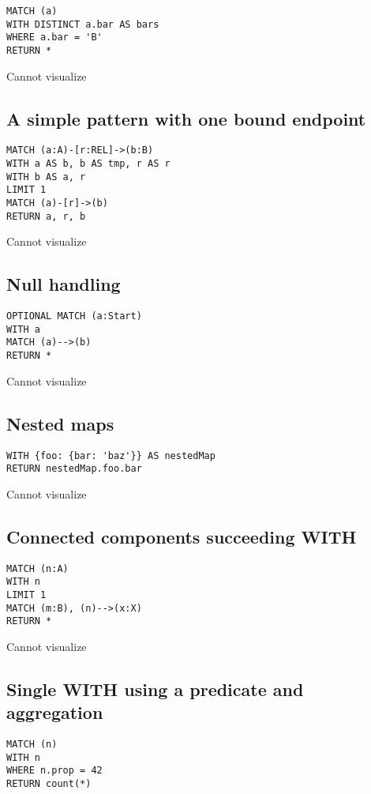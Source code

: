 \begin{lstlisting}
MATCH (a)
WITH DISTINCT a.bar AS bars
WHERE a.bar = 'B'
RETURN *
\end{lstlisting}

Cannot visualize
\subsection{A simple pattern with one bound endpoint}

\begin{lstlisting}
MATCH (a:A)-[r:REL]->(b:B)
WITH a AS b, b AS tmp, r AS r
WITH b AS a, r
LIMIT 1
MATCH (a)-[r]->(b)
RETURN a, r, b
\end{lstlisting}

Cannot visualize
\subsection{Null handling}

\begin{lstlisting}
OPTIONAL MATCH (a:Start)
WITH a
MATCH (a)-->(b)
RETURN *
\end{lstlisting}

Cannot visualize
\subsection{Nested maps}

\begin{lstlisting}
WITH {foo: {bar: 'baz'}} AS nestedMap
RETURN nestedMap.foo.bar
\end{lstlisting}

Cannot visualize
\subsection{Connected components succeeding WITH}

\begin{lstlisting}
MATCH (n:A)
WITH n
LIMIT 1
MATCH (m:B), (n)-->(x:X)
RETURN *
\end{lstlisting}

Cannot visualize
\subsection{Single WITH using a predicate and aggregation}

\begin{lstlisting}
MATCH (n)
WITH n
WHERE n.prop = 42
RETURN count(*)
\end{lstlisting}

